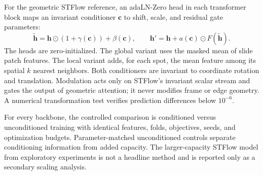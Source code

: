 \begin{table}[t]
\centering\small
\setlength{\tabcolsep}{3.5pt}
\caption{Context used by each original prediction path. The taxonomy is defined independently of
the FiLM results.}
\label{tab:context}
\end{table}

For the geometric STFlow reference, an adaLN-Zero head in each transformer block maps an invariant conditioner $\mathbf c$
to shift, scale, and residual gate parameters:
\begin{equation}
\tilde{\mathbf h}=\mathbf h\odot(1+\gamma(\mathbf c))+\beta(\mathbf c),\qquad
\mathbf h' = \mathbf h+a(\mathbf c)\odot F(\tilde{\mathbf h}).
\end{equation}
The heads are zero-initialized. The global variant uses the masked mean of slide patch features. The
local variant adds, for each spot, the mean feature among its spatial $k$ nearest neighbors. Both
conditioners are invariant to coordinate rotation and translation. Modulation acts only on STFlow's
invariant scalar stream and gates the output of geometric attention; it never modifies frame or edge
geometry. A numerical transformation test verifies prediction differences below $10^{-6}$.

For every backbone, the controlled comparison is conditioned versus unconditioned training with identical
features, folds, objectives, seeds, and optimization budgets. Parameter-matched unconditioned controls
separate conditioning information from added capacity. The larger-capacity STFlow model from
exploratory experiments is not a headline method and is reported only as a secondary scaling analysis.
